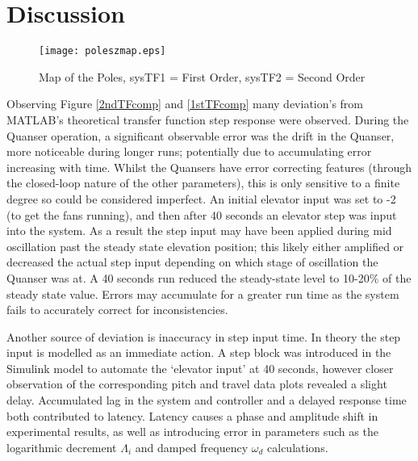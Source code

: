\section{Discussion}\label{discussion}

\begin{wrapfigure}{r}{0.56\textwidth}
  \begin{center}
  \vspace{-40pt}
  \texttt{[image: poleszmap.eps]}
  \end{center}
  \caption{Map of the Poles, sysTF1 = First Order, sysTF2 = Second Order}
 \label{poleszmap}
  \vspace{-20pt}
\end{wrapfigure}

Observing Figure \ref{2ndTFcomp} and \ref{1stTFcomp} many deviation's
from MATLAB's theoretical transfer function step response were observed.
During the Quanser operation, a significant observable error was the
drift in the Quanser, more noticeable during longer runs; potentially
due to accumulating error increasing with time. Whilst the Quansers have
error correcting features (through the closed-loop nature of the other
parameters), this is only sensitive to a finite degree so could be
considered imperfect. An initial elevator input was set to -2 (to get
the fans running), and then after 40 seconds an elevator step was input
into the system. As a result the step input may have been applied during
mid oscillation past the steady state elevation position; this likely
either amplified or decreased the actual step input depending on which
stage of oscillation the Quanser was at. A 40 seconds run reduced the
steady-state level to 10-20\% of the steady state value. Errors may
accumulate for a greater run time as the system fails to accurately
correct for inconsistencies.

Another source of deviation is inaccuracy in step input time. In theory
the step input is modelled as an immediate action. A step block was
introduced in the Simulink model to automate the `elevator input' at 40
seconds, however closer observation of the corresponding pitch and
travel data plots revealed a slight delay. Accumulated lag in the system
and controller and a delayed response time both contributed to latency.
Latency causes a phase and amplitude shift in experimental results, as
well as introducing error in parameters such as the logarithmic
decrement \(\Lambda_i\) and damped frequency \(\omega_d\) calculations.

